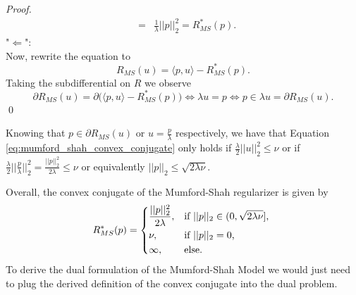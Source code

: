 \begin{enumerate}
\begin{proof}
\begin{eqnarray}
                                &=& \frac{1}{\lambda} ||p||_{2}^{2} = R_{MS}^{\ast}(p).
                            \end{eqnarray}
                        "$\Longleftarrow$":\\
                        Now, rewrite the equation to
                            $$
                                R_{MS}(u) = \langle p, u \rangle - R_{MS}^{\ast}(p).
                            $$
                        Taking the subdifferential on $R$ we observe
                            $$
                                \partial R_{MS}(u) = \partial \bigg( \langle p, u \rangle - R_{MS}^{\ast}(p) \bigg) \Longleftrightarrow \lambda u = p \Longleftrightarrow p \in \lambda u = \partial R_{MS}(u).
                            $$
                        \qed
                    \end{proof}
                Knowing that $p \in \partial R_{MS}(u)$ or $u = \frac{p}{\lambda}$ respectively, we have that Equation \ref{eq:mumford_shah_convex_conjugate} only holds if $\frac{\lambda}{2} ||u||_{2}^{2} \le \nu$ or if $\frac{\lambda}{2} ||\frac{p}{\lambda}||_{2}^{2} = \frac{||p||_{2}^{2}}{2\lambda} \le \nu$ or equivalently $||p||_{2} \le \sqrt{2 \lambda \nu}$.
            \end{enumerate}
        Overall, the convex conjugate of the Mumford-Shah regularizer is given by
            \begin{equation}
                R_{MS}^{\ast}(p) =
                    \begin{dcases*}
                        \frac{||p||_{2}^{2}}{2\lambda}, & \textnormal{if $||p||_{2} \in (0, \sqrt{2 \lambda \nu}]$,} \\
                        \nu, & \textnormal{if $||p||_{2} = 0$,} \\
                        \infty, & \textnormal{else.}
                    \end{dcases*}
                \label{eq:r_star}
            \end{equation}
        To derive the dual formulation of the Mumford-Shah Model we would just need to plug the derived definition of the convex conjugate into the dual problem.
